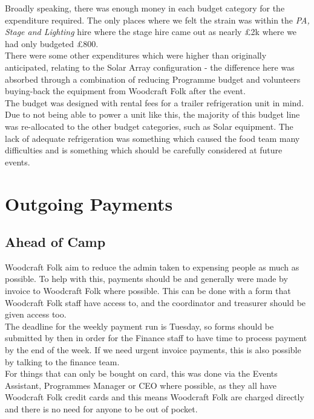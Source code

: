 Broadly speaking, there was enough money in each budget category for the expenditure required. The only places where we felt the strain was within the \textit{PA, Stage and Lighting} hire where the stage hire came out as nearly \pounds2k where we had only budgeted \pounds800.\\

There were some other expenditures which were higher than originally anticipated, relating to the Solar Array configuration - the difference here was absorbed through a combination of reducing Programme budget and volunteers buying-back the equipment from Woodcraft Folk after the event.\\

The budget was designed with rental fees for a trailer refrigeration unit in mind. Due to not being able to power a unit like this, the majority of this budget line was re-allocated to the other budget categories, such as Solar equipment. The lack of adequate refrigeration was something which caused the food team many difficulties and is something which should be carefully considered at future events.

\section{Outgoing Payments}
\subsection{Ahead of Camp}
Woodcraft Folk aim to reduce the admin taken to expensing people as much as possible. To help with this, payments should be and generally were made by invoice to Woodcraft Folk where possible. This can be done with a form that Woodcraft Folk staff have access to, and the coordinator and treasurer should be given access too. \\
The deadline for the weekly payment run is Tuesday, so  forms should be submitted by then in order for the Finance staff to have time to process payment by the end of the week. If we need urgent invoice payments, this is also possible by talking to the finance team.\\ 

For things that can only be bought on card, this was done via the Events Assistant, Programmes Manager or CEO where possible, as they all have Woodcraft Folk credit cards and this means Woodcraft Folk are charged directly and there is no need for anyone to be out of pocket.\\


